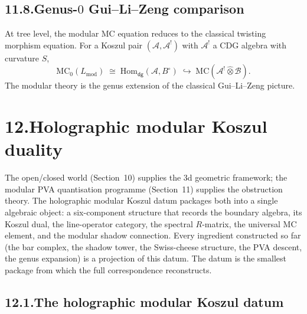 \documentclass[11pt,reqno]{amsart}
\theoremstyle{definition}
\theoremstyle{remark}
\providecommand{\cA}{\mathcal{A}}
\providecommand{\cB}{\mathcal{B}}
\providecommand{\MC}{\mathrm{MC}}
\providecommand{\Hom}{\mathrm{Hom}}
\providecommand{\mod}{\mathrm{mod}}
\numberwithin{equation}{section}
\begin{document}
\subsection*{11.8.\enspace Genus-$0$ Gui--Li--Zeng comparison}

At tree level, the modular MC equation reduces to the
classical twisting morphism equation. For a Koszul pair
$(\cA, \cA^!)$ with $\cA^!$ a CDG algebra with curvature $S$,
\[
\MC_0(L_{\mod})
\;\cong\;
\Hom_{\mathsf{dg}}(\cA, B^\circ)
\;\hookrightarrow\;
\MC(\cA^! \widehat\otimes \cB).
\]
The modular theory is the genus extension of the classical
Gui--Li--Zeng picture.


\section*{12.\quad Holographic modular Koszul duality}

The open/closed world (Section~10) supplies the 3d geometric
framework; the modular PVA quantisation programme
(Section~11) supplies the obstruction theory. The holographic
modular Koszul datum packages both into a single algebraic
object: a six-component structure that records the boundary
algebra, its Koszul dual, the line-operator category, the
spectral $R$-matrix, the universal MC element, and the modular
shadow connection. Every ingredient constructed so far (the
bar complex, the shadow tower, the Swiss-cheese structure, the
PVA descent, the genus expansion) is a projection of this
datum. The datum is the smallest package from which the full
correspondence reconstructs.

\subsection*{12.1.\enspace The holographic modular Koszul datum}
\end{document}
